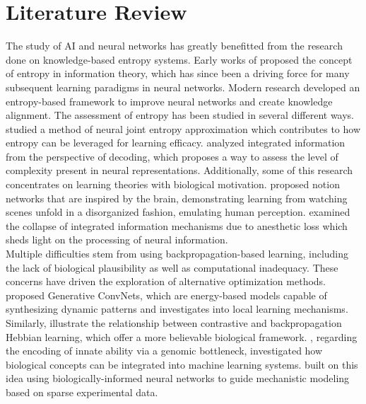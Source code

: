 \documentclass{article}
\begin{document}
\section{Literature Review}
The study of AI and neural networks has greatly benefitted from the research done on knowledge-based entropy systems. Early works of \cite{Shannon1948} proposed the concept of entropy in information theory, which has since been a driving force for many subsequent learning paradigms in neural networks. Modern research developed an entropy-based framework to improve neural networks and create knowledge alignment. The assessment of entropy has been studied in several different ways. \cite{Shalev2022} studied a method of neural joint entropy approximation which contributes to how entropy can be leveraged for learning efficacy. \cite{Oizumi2015} analyzed integrated information from the perspective of decoding, which proposes a way to assess the level of complexity present in neural representations. Additionally, some of this research concentrates on learning theories with biological motivation. \cite{Weng2022} proposed notion networks that are inspired by the brain, demonstrating learning from watching scenes unfold in a disorganized fashion, emulating human perception. \cite{Leung2021} examined the collapse of integrated information mechanisms due to anesthetic loss which sheds light on the processing of neural information.\\
\indent Multiple difficulties stem from using backpropagation-based learning, including the lack of biological plausibility as well as computational inadequacy. These concerns have driven the exploration of alternative optimization methods. \cite{Xie2017} proposed Generative ConvNets, which are energy-based models capable of synthesizing dynamic patterns and investigates into local learning mechanisms. Similarly,  \cite{Xie2003} illustrate the relationship between contrastive and backpropagation Hebbian learning, which offer a more believable biological framework. \cite{Koulakov2023}, regarding the encoding of innate ability via a genomic bottleneck, investigated how biological concepts can be integrated into machine learning systems. \cite{Lagergren2020} built on this idea using biologically-informed neural networks to guide mechanistic modeling based on sparse experimental data. \\
\end{document}
